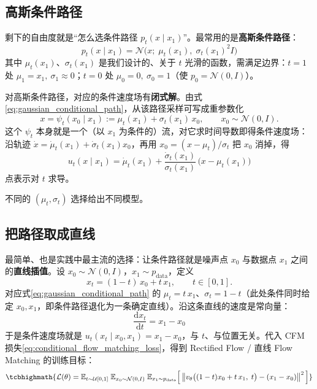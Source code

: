 \subsection{高斯条件路径}

剩下的自由度就是“怎么选条件路径 $p_t(x\mid x_1)$”。最常用的是\textbf{高斯条件路径}：
\begin{equation}\label{eq:gaussian_conditional_path}
p_t(x\mid x_1) = \mathcal N\big(x;\; \mu_t(x_1),\; \sigma_t(x_1)^2 I\big)
\end{equation}
其中 $\mu_t(x_1)$、$\sigma_t(x_1)$ 是我们设计的、关于 $t$ 光滑的函数，需满足边界：$t=1$ 处 $\mu_1=x_1,\ \sigma_1\approx 0$；$t=0$ 处 $\mu_0=0,\ \sigma_0=1$（使 $p_0=\mathcal N(0,I)$）。

对高斯条件路径，对应的条件速度场有\textbf{闭式解}。由式\eqref{eq:gaussian_conditional_path}，从该路径采样可写成重参数化
\begin{equation}
x = \psi_t(x_0\mid x_1) := \mu_t(x_1) + \sigma_t(x_1)\,x_0, \qquad x_0\sim\mathcal N(0,I).
\end{equation}
这个 $\psi_t$ 本身就是一个（以 $x_1$ 为条件的）流，对它求时间导数即得条件速度场：沿轨迹 $\dot x = \dot\mu_t(x_1) + \dot\sigma_t(x_1)x_0$，再用 $x_0=(x-\mu_t)/\sigma_t$ 把 $x_0$ 消掉，得
\begin{equation}\label{eq:conditional_velocity_field_gaussian}
u_t(x\mid x_1) = \dot\mu_t(x_1) + \frac{\dot\sigma_t(x_1)}{\sigma_t(x_1)}\,\big(x - \mu_t(x_1)\big)
\end{equation}
点表示对 $t$ 求导。

不同的 $(\mu_t,\sigma_t)$ 选择给出不同模型。

\subsection{把路径取成直线}

最简单、也是实践中最主流的选择：让条件路径就是噪声点 $x_0$ 与数据点 $x_1$ 之间的\textbf{直线插值}。设 $x_0\sim\mathcal N(0,I)$，$x_1\sim p_{\text{data}}$，定义
\begin{equation}\label{eq:linear_interpolation_path}
\boxed{\; x_t = (1-t)\,x_0 + t\,x_1, \qquad t\in[0,1]. \;}
\end{equation}
对应式\eqref{eq:gaussian_conditional_path} 的 $\mu_t = t\,x_1$、$\sigma_t = 1-t$（此处条件同时给定 $x_0,x_1$，即条件路径退化为一条确定直线）。沿这条直线的速度是常向量：
\begin{equation}\label{eq:linear_interpolation_velocity}
\frac{\mathrm{d}x_t}{\mathrm{d}t} = x_1 - x_0
\end{equation}
于是条件速度场就是 $u_t(x_t\mid x_0,x_1) = x_1 - x_0$，与 $t$、与位置无关。代入 CFM 损失\eqref{eq:conditional_flow_matching_loss}，得到 Rectified Flow / 直线 Flow Matching 的训练目标：
\begin{equation}
\tcbhighmath{
\mathcal L(\theta) = \mathbb{E}_{t\sim\mathcal U[0,1]}\;\mathbb{E}_{x_0\sim\mathcal N(0,I)}\;\mathbb{E}_{x_1\sim p_{\text{data}}}
\Big[\,\big\| v_\theta\big((1-t)x_0 + t\,x_1,\; t\big) - (x_1 - x_0)\big\|^2\,\Big]
}
\end{equation}

